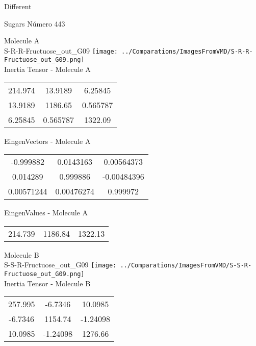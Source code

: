 \begin{center}
\vtab
\vtab
\textcolor{NavyBlue}{\Large Different}
\end{center}

 \newpage

\vtab[-2cm]
\begin{center}
{\large Sugars \tab Número 443}
\end{center}
\begin{multicols}{2}
\begin{center}

Molecule A \\ 
S-R-R-Fructuose\_out\_G09
\texttt{[image: ../Comparations/ImagesFromVMD/S-R-R-Fructuose\_out\_G09.png]}
\\
Inertia Tensor - Molecule A \\
\vtab

\begin{tabular}{|c c c|}
214.974	 & 	13.9189	 & 	6.25845	 \\
13.9189	 & 	1186.65	 & 	0.565787	 \\
6.25845	 & 	0.565787	 & 	1322.09
\end{tabular}

\vtab
 EingenVectors - Molecule A     \\
\vtab
\begin{tabular}{|c c c|}
-0.999882	 & 	0.0143163	 & 	0.00564373	 \\
0.014289	 & 	0.999886	 & 	-0.00484396	 \\
0.00571244	 & 	0.00476274	 & 	0.999972
\end{tabular}

\vtab
 EingenValues - Molecule A     \\
\vtab
\begin{tabular}{|c c c|}
214.739	 & 	1186.84	 & 	1322.13	 \\
\end{tabular}
\columnbreak

Molecule B \\ 
S-S-R-Fructuose\_out\_G09
\texttt{[image: ../Comparations/ImagesFromVMD/S-S-R-Fructuose\_out\_G09.png]}
\\
Inertia Tensor - Molecule B \\
\vtab

\begin{tabular}{|c c c|}
257.995	 & 	-6.7346	 & 	10.0985	 \\
-6.7346	 & 	1154.74	 & 	-1.24098	 \\
10.0985	 & 	-1.24098	 & 	1276.66
\end{tabular}


\end{center}
\end{multicols}
